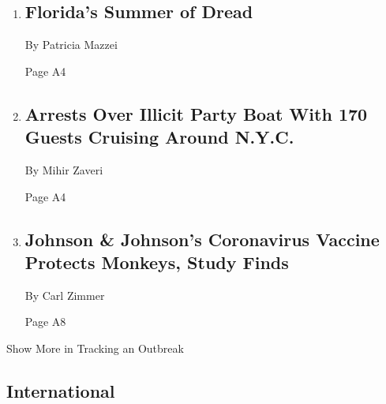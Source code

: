 \begin{enumerate}
\def\labelenumi{\arabic{enumi}.}
\item
  \href{/2020/08/02/us/florida-hurricane-isaias-coronavirus.html}{}

  \hypertarget{floridas-summer-of-dread-1}{%
  \subsection{Florida's Summer of
  Dread}\label{floridas-summer-of-dread-1}}

  By Patricia Mazzei

  Page A4
\item
  \href{/2020/08/02/nyregion/liberty-belle-illegal-party.html}{}

  \hypertarget{arrests-over-illicit-party-boat-with-170-guests-cruising-around-nyc}{%
  \subsection{Arrests Over Illicit Party Boat With 170 Guests Cruising
  Around
  N.Y.C.}\label{arrests-over-illicit-party-boat-with-170-guests-cruising-around-nyc}}

  By Mihir Zaveri

  Page A4
\item
  \href{/2020/07/30/health/covid-19-vaccine-monkeys.html}{}

  \hypertarget{johnson--johnsons-coronavirus-vaccine-protects-monkeys-study-finds}{%
  \subsection{Johnson \& Johnson's Coronavirus Vaccine Protects Monkeys,
  Study
  Finds}\label{johnson--johnsons-coronavirus-vaccine-protects-monkeys-study-finds}}

  By Carl Zimmer

  Page A8
\end{enumerate}

Show More in Tracking an Outbreak

\hypertarget{international}{%
\subsection{International}\label{international}}

